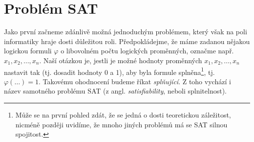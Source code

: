 \section{Problém SAT}\label{sec:sat}

Jako první začneme zdánlivě možná jednoduchým problémem, který však na poli informatiky hraje dosti důležitou roli. Předpokládejme, že máme zadanou nějakou logickou formuli $\varphi$ o libovolném počtu logických proměnných, označme např. $x_1,x_2,\dots,x_n$. Naší otázkou je, jestli je možné hodnoty proměnných $x_1,x_2,\dots,x_n$ nastavit tak (tj. dosadit hodnoty 0 a 1), aby byla formule splněna\footnote{Může se na první pohled zdát, že se jedná o dosti teoretickou záležitost, nicméně později uvidíme, že mnoho jiných problémů má se SAT silnou spojitost.}, tj. $\varphi(\dots)=1$. Takovému ohodnocení budeme říkat \emph{splňující}. Z toho vychází i název samotného problému SAT (z angl. \emph{satisfiability}, neboli splnitelnost).